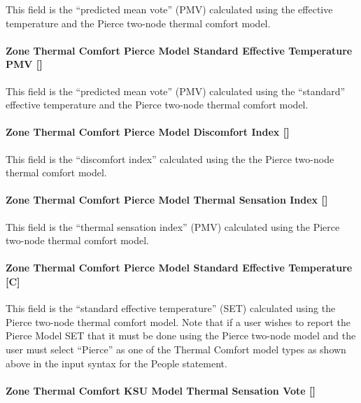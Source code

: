 This field is the ``predicted mean vote'' (PMV) calculated using the effective temperature and the Pierce two-node thermal comfort model.

\paragraph{Zone Thermal Comfort Pierce Model Standard Effective Temperature PMV {[]}}\label{zone-thermal-comfort-pierce-model-standard-effective-temperature-pmv}

This field is the ``predicted mean vote'' (PMV) calculated using the ``standard'' effective temperature and the Pierce two-node thermal comfort model.

\paragraph{Zone Thermal Comfort Pierce Model Discomfort Index {[]}}\label{zone-thermal-comfort-pierce-model-discomfort-index}

This field is the ``discomfort index'' calculated using the the Pierce two-node thermal comfort model.

\paragraph{Zone Thermal Comfort Pierce Model Thermal Sensation Index {[]}}\label{zone-thermal-comfort-pierce-model-thermal-sensation-index}

This field is the ``thermal sensation index'' (PMV) calculated using the Pierce two-node thermal comfort model.

\paragraph{Zone Thermal Comfort Pierce Model Standard Effective Temperature {[C]}}\label{zone-thermal-comfort-pierce-model-standard-effective-temperature}

This field is the ``standard effective temperature'' (SET) calculated using the Pierce two-node thermal comfort model.  Note that if a user wishes to report the Pierce Model SET that it must be done using the Pierce two-node model and the user must select ``Pierce'' as one of the Thermal Comfort model types as shown above in the input syntax for the People statement.

\paragraph{Zone Thermal Comfort KSU Model Thermal Sensation Vote {[]}}\label{zone-thermal-comfort-ksu-model-thermal-sensation-vote}

